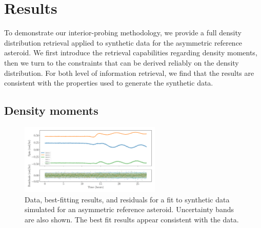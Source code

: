 \documentclass[fleqn,usenatbib]{mnras}
\begin{document}
\section{Results}
\label{sec:results}

To demonstrate our interior-probing methodology, we provide a full density distribution retrieval applied to synthetic data for the asymmetric reference asteroid. We first introduce the retrieval capabilities regarding density moments, then we turn to the constraints that can be derived reliably on the density distribution. For both level of information retrieval, we find that the results are consistent with the properties used to generate the synthetic data.

\subsection{Density moments}
\label{sec:example-fit}
\begin{figure}
  \centering
  \includegraphics[width=0.6\textwidth]{figs/example-residuals.pdf}
  \caption{Data, best-fitting results, and residuals for a fit to synthetic data simulated for an asymmetric reference asteroid. Uncertainty bands are also shown. The best fit results appear consistent with the data.}
  \label{fig:example-residuals}
\end{figure}
\end{document}
